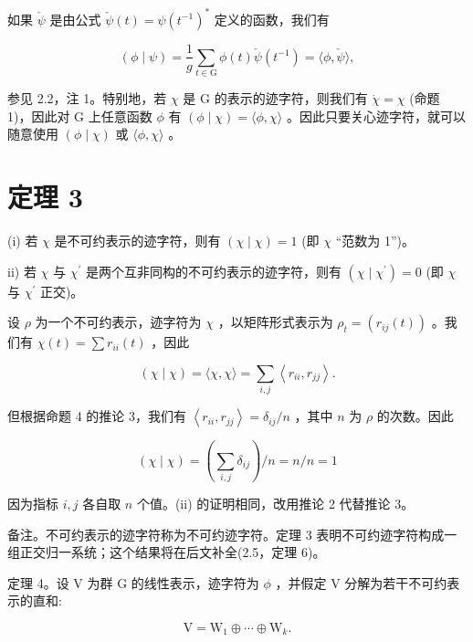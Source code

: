\documentclass[10pt]{article}
\begin{document}
如果 \(\check{\psi }\) 是由公式 \(\check{\psi }\left( t\right)  = \psi {\left( {t}^{-1}\right) }^{ * }\) 定义的函数，我们有

\[
\left( {\phi  \mid  \psi }\right)  = \frac{1}{g}\mathop{\sum }\limits_{{t \in  \mathrm{G}}}\phi \left( t\right) \check{\psi }\left( {t}^{-1}\right)  = \langle \phi ,\check{\psi }\rangle ,
\]

参见 2.2，注 1。特别地，若 \(\chi\) 是 G 的表示的迹字符，则我们有 \(\dot{\chi } = \chi\) (命题 1)，因此对 G 上任意函数 \(\phi\) 有 \(\left( {\phi  \mid  \chi }\right)  = \langle \phi ,\chi \rangle\) 。因此只要关心迹字符，就可以随意使用 \(\left( {\phi  \mid  \chi }\right)\) 或 \(\langle \phi ,\chi \rangle\) 。

\section*{定理 3}

(i) 若 \(\chi\) 是不可约表示的迹字符，则有 \(\left( {\chi  \mid  \chi }\right)  = 1\) (即 \(\chi\) “范数为 1”)。

ii) 若 \(\chi\) 与 \({\chi }^{\prime }\) 是两个互非同构的不可约表示的迹字符，则有 \(\left( {\chi  \mid  {\chi }^{\prime }}\right)  = 0\) (即 \(\chi\) 与 \({\chi }^{\prime }\) 正交)。

设 \(\rho\) 为一个不可约表示，迹字符为 \(\chi\) ，以矩阵形式表示为 \({\rho }_{t} = \left( {{r}_{ij}\left( t\right) }\right)\) 。我们有 \(\chi \left( t\right)  = \sum {r}_{ii}\left( t\right)\) ，因此

\[
\left( {\chi  \mid  \chi }\right)  = \langle \chi ,\chi \rangle  = \mathop{\sum }\limits_{{i,j}}\left\langle  {{r}_{ii},{r}_{jj}}\right\rangle  .
\]

但根据命题 4 的推论 3，我们有 \(\left\langle  {{r}_{ii},{r}_{jj}}\right\rangle   = {\delta }_{ij}/n\) ，其中 \(n\) 为 \(\rho\) 的次数。因此

\[
\left( {\chi  \mid  \chi }\right)  = \left( {\mathop{\sum }\limits_{{i,j}}{\delta }_{ij}}\right) /n = n/n = 1
\]

因为指标 \(i,j\) 各自取 \(n\) 个值。(ii) 的证明相同，改用推论 2 代替推论 3。

备注。不可约表示的迹字符称为不可约迹字符。定理 3 表明不可约迹字符构成一组正交归一系统；这个结果将在后文补全(2.5，定理 6)。

定理 4。设 \(\mathrm{V}\) 为群 \(\mathrm{G}\) 的线性表示，迹字符为 \(\phi\) ，并假定 \(\mathrm{V}\) 分解为若干不可约表示的直和:

\[
\mathrm{V} = {\mathrm{W}}_{1} \oplus  \cdots  \oplus  {\mathrm{W}}_{k}.
\]
\end{document}
